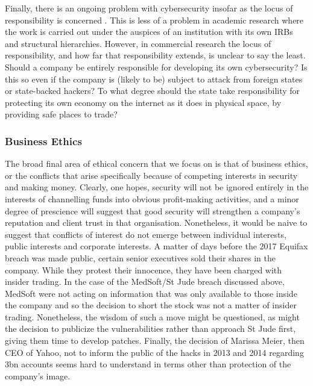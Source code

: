 \documentclass{svjour3}                     %
\begin{document}
Finally, there is an ongoing problem with cybersecurity insofar as the locus of responsibility is concerned \cite[p.~70--88]{guiora2017cybersecurity}. This is less of a problem in academic research where the work is carried out under the auspices of an institution with its own IRBs and structural hierarchies. However, in commercial research the locus of responsibility, and how far that responsibility extends, is unclear to say the least. Should a company be entirely responsible for developing its own cybersecurity? Is this so even if the company is (likely to be) subject to attack from foreign states or state-backed hackers? To what degree should the state take responsibility for protecting its own economy on the internet as it does in physical space, by providing safe places to trade?

\subsubsection{Business Ethics}
The broad final area of ethical concern that we focus on is that of business ethics, or the conflicts that arise specifically because of competing interests in security and making money.  Clearly, one hopes, security will not be ignored entirely in the interests of channelling funds into obvious profit-making activities, and a minor degree of prescience will suggest that good security will strengthen a company’s reputation and client trust in that organisation.  Nonetheless, it would be naive to suggest that conflicts of interest do not emerge between individual interests, public interests and corporate interests. A matter of days before the 2017 Equifax breach was made public, certain senior executives sold their shares in the company. While they protest their innocence, they have been charged with insider trading. In the case of the MedSoft/St Jude breach discussed above, MedSoft were not acting on information that was only available to those inside the company and so the decision to short the stock was not a matter of insider trading. Nonetheless, the wisdom of such a move might be questioned, as might the decision to publicize the vulnerabilities rather than approach St Jude first, giving them time to develop patches. Finally, the decision of Marissa Meier, then CEO of Yahoo, not to inform the public of the hacks in 2013 and 2014 regarding 3bn accounts seems hard to understand in terms other than protection of the company’s image.
\end{document}
